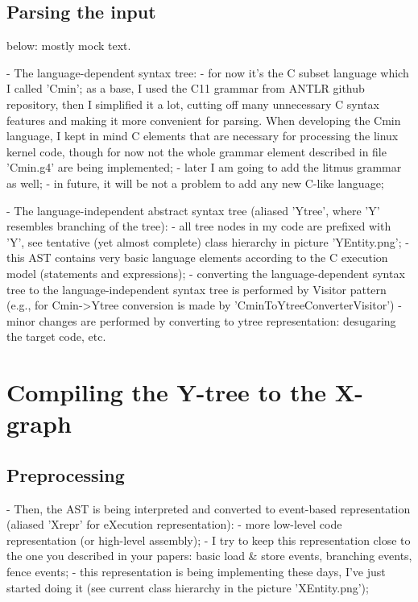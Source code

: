 \subsection{Parsing the input}
\label{ch:impl:input-parser}

below: mostly mock text.

- The language-dependent syntax tree:
        - for now it's the C subset language which I called 'Cmin'; as a base, I used the C11 grammar from ANTLR github repository, then I simplified it a lot, cutting off many unnecessary C syntax features and making it more convenient for parsing. When developing the Cmin language, I kept in mind C elements that are necessary for processing the linux kernel code, though for now not the whole grammar element described in file 'Cmin.g4' are being implemented;
        - later I am going to add the litmus grammar as well;
        - in future, it will be not a problem to add any new C-like language;

- The language-independent abstract syntax tree (aliased 'Ytree', where 'Y' resembles branching of the tree):
        - all tree nodes in my code are prefixed with 'Y', see tentative (yet almost complete) class hierarchy in picture 'YEntity.png';
        - this AST contains very basic language elements according to the C execution model (statements and expressions);
        - converting the language-dependent syntax tree to the language-independent syntax tree is performed by Visitor pattern (e.g., for Cmin->Ytree conversion is made by 'CminToYtreeConverterVisitor')
        - minor changes are performed by converting to ytree representation: desugaring the target code, etc.


\section{Compiling the Y-tree to the X-graph}
\label{ch:impl:y2x}

\subsection{Preprocessing}
\label{ch:impl:y2x:preproc}
- Then, the AST is being interpreted and converted to event-based representation (aliased 'Xrepr' for eXecution representation):
        - more low-level code representation (or high-level assembly);
        - I try to keep this representation close to the one you described in your papers: basic load \& store events, branching events, fence events;
        - this representation is being implementing these days, I've just started doing it (see current class hierarchy in the picture 'XEntity.png');
        
